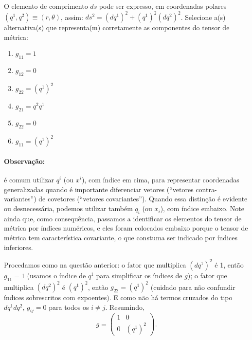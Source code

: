 \begin{question}
    O elemento de comprimento $ds$ pode ser expresso, em coordenadas polares $(q^1, q^2) \equiv (r, \theta)$, assim: $ds^2 = (dq^1)^2 + (q^1)^2 (dq^2)^2$.
    Selecione a(s) alternativa(s) que representa(m) corretamente as componentes do tensor de métrica:
    \begin{enumerate}
      \item $g_{11} = 1$ \rightanswer
      \item $g_{12} = 0$ \rightanswer
      \item $g_{22} = (q^1)^2$ \rightanswer
      \item $g_{21} = q^2 q^1$
      \item $g_{22} = 0$
      \item $g_{11} = (q^1)^2$
    \end{enumerate}

    \paragraph{Observação:} é comum utilizar $q^i$ (ou $x^i$), com índice em cima, para representar coordenadas generalizadas quando é importante diferenciar vetores (``vetores contra-variantes'') de covetores (``vetores covariantes'').
    Quando essa distinção é evidente ou desnecessária, podemos utilizar também $q_i$ (ou $x_i$), com índice embaixo.
    Note ainda que, como consequência, passamos a identificar os elementos do tensor de métrica por índices numéricos, e eles foram colocados embaixo porque o tensor de métrica tem característica covariante, o que constuma ser indicado por índices inferiores.

    \begin{solution}
      Procedamos como na questão anterior: o fator que multiplica $(dq^1)^2$ é 1, então $g_{11} = 1$ (usamos o índice de $q^1$ para simplificar os índices de $g$);
      o fator que multiplica $(dq^2)^2$ é $(q^1)^2$, então $g_{22} = (q^1)^2$ (cuidado para não confundir índices sobrescritos com expoentes).
      E como não há termos cruzados do tipo $dq^1 dq^2$, $g_{ij} = 0$ para todos os $i \ne j$.
      Resumindo,
      \begin{equation*}
        g = \begin{pmatrix}
          1 & 0 \\
          0 & (q^1)^2
        \end{pmatrix}.
      \end{equation*}
    \end{solution}
\end{question}